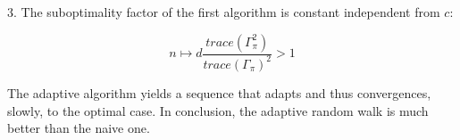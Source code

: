 3. The suboptimality factor of the first algorithm is constant independent from $c$:

$$n \mapsto d\frac{trace(\Gamma_{\pi} ^2) }{trace(\Gamma_{\pi})^2}>1$$

The adaptive algorithm yields a sequence that adapts and thus convergences, slowly, to the optimal case. In conclusion, the adaptive random walk is much better than the naive one.




